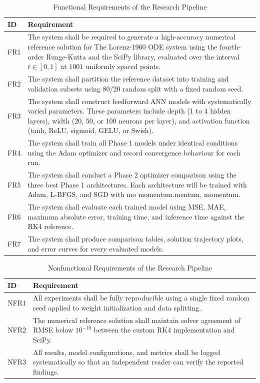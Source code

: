 \begin{table}[H]
\centering
\caption{Functional Requirements of the Research Pipeline}
\label{tab:fr}
\renewcommand{\arraystretch}{1.2}
\begin{tabular}{|p{1.2cm}|p{12.5cm}|}
\hline
\textbf{ID} & \textbf{Requirement} \\
\hline
FR1 & The system shall be required to generate a high-accuracy numerical reference solution for The Lorenz-1960 ODE system using the fourth-order Runge-Kutta and the SciPy library, evaluated over the interval $t \in [0, 1]$ at $1001$ uniformly spaced points. \\
\hline
FR2 & The system shall partition the reference dataset into training and validation subsets using 80/20 random split with a fixed random seed. \\
\hline
FR3 & The system shall construct feedforward ANN models with systematically varied parameters.
These parameters include depth (1 to 4 hidden layers), width (20, 50, or 100 neurons per layer),
and activation function (tanh, ReLU, sigmoid, GELU, or Swish). \\
\hline
FR4 & The system shall train all Phase 1 models under identical conditions using the Adam optimizer and record convergence behaviour for each run. \\
\hline
FR5 & The system shall conduct a Phase 2 optimizer comparison using the three best Phase 1 architectures.
Each architecture will be trained with Adam, L-BFGS, and SGD with mo momentum.mentum.
momentum. \\
\hline
FR6 & The system shall evaluate each trained model using MSE, MAE, maximum absolute error, training time, and inference time against the RK4 reference. \\
\hline
FR7 & The system shall produce comparison tables, solution trajectory plots, and error curves for every evaluated models. \\
\hline
\end{tabular}
\end{table}

\begin{table}[H]
\centering
\caption{Nonfunctional Requirements of the Research Pipeline}
\label{tab:nfr}
\renewcommand{\arraystretch}{1.2}
\begin{tabular}{|p{1.5cm}|p{12.2cm}|}
\hline
\textbf{ID} & \textbf{Requirement} \\
\hline
NFR1 & All experiments shall be fully reproducible using a single fixed random seed applied to weight initialization and data splitting. \\
\hline
NFR2 & The numerical reference solution shall maintain solver agreement of RMSE below $10^{-10}$ between the custom RK4 implementation and SciPy. \\
\hline
NFR3 & All results, model configurations, and metrics shall be logged systematically so that an independent reader can verify the reported findings. \\
\hline
\end{tabular}
\end{table}

